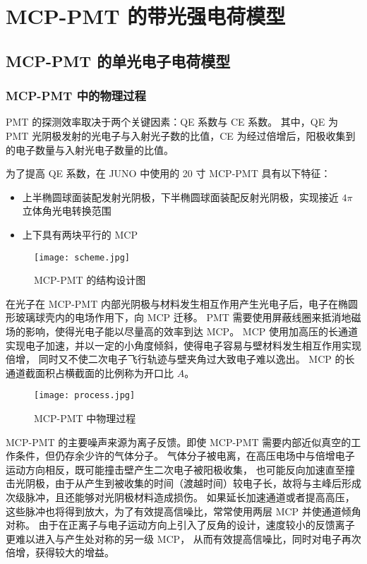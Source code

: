 
\chapter{MCP-PMT 的带光强电荷模型}

\section{MCP-PMT 的单光电子电荷模型}
\subsection{MCP-PMT 中的物理过程}\label{sec:mcp-pmt-process}
PMT 的探测效率取决于两个关键因素：QE 系数与 CE 系数。
其中，QE 为 PMT 光阴极发射的光电子与入射光子数的比值，CE 为经过倍增后，阳极收集到的电子数量与入射光电子数量的比值。

为了提高 QE 系数，在 JUNO 中使用的 20 寸 MCP-PMT 具有以下特征：
\begin{itemize}
    \item 上半椭圆球面装配发射光阴极，下半椭圆球面装配反射光阴极，实现接近 $4\pi$ 立体角光电转换范围
    \item 上下具有两块平行的 MCP
\end{itemize}

\begin{figure}
    \centering
    \texttt{[image: scheme.jpg]}
    \caption{MCP-PMT 的结构设计图\cite{wangNewDesignLarge2012}}
\end{figure}

在光子在 MCP-PMT 内部光阴极与材料发生相互作用产生光电子后，电子在椭圆形玻璃球壳内的电场作用下，向 MCP 迁移。
PMT 需要使用屏蔽线圈来抵消地磁场的影响，使得光电子能以尽量高的效率到达 MCP。
MCP 使用加高压的长通道实现电子加速，并以一定的小角度倾斜，使得电子容易与壁材料发生相互作用实现倍增，
同时又不使二次电子飞行轨迹与壁夹角过大致电子难以逸出。
MCP 的长通道截面积占横截面的比例称为开口比 $A$。

\begin{figure}
    \centering
    \texttt{[image: process.jpg]}
    \caption{MCP-PMT 中物理过程\cite{chenPhotoelectronBackscatteringMicrochannel2018}}
    \label{fig:pulses}
\end{figure}

MCP-PMT 的主要噪声来源为离子反馈\cite{MaterialStore2010}。即使 MCP-PMT 需要内部近似真空的工作条件，但仍存余少许的气体分子。
气体分子被电离，在高压电场中与倍增电子运动方向相反，既可能撞击壁产生二次电子被阳极收集，
也可能反向加速直至撞击光阴极，由于从产生到被收集的时间（渡越时间）较电子长，故将与主峰后形成次级脉冲，且还能够对光阴极材料造成损伤。
如果延长加速通道或者提高高压，这些脉冲也将得到放大，为了有效提高信噪比，常常使用两层 MCP 并使通道倾角对称。
由于在正离子与电子运动方向上引入了反角的设计，速度较小的反馈离子更难以进入与产生处对称的另一级 MCP，
从而有效提高信噪比，同时对电子再次倍增，获得较大的增益。

